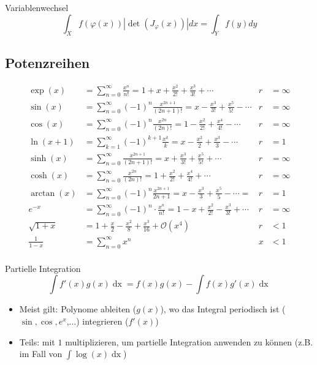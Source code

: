 \documentclass[a4paper,10pt]{article}
\def\sumn{\sum_{n=0}^\infty}
\def\sumk{\sum_{k=1}^\infty}
\begin{document}
\begin{subbox}{Variablenwechsel}
	$$\int_X f(\varphi(x)) | \det(J_\varphi(x)) | dx = \int_Y f(y) dy$$
\end{subbox}

\subsection{Potenzreihen}
\begin{align*}
	\exp(x)         & = \sumn \frac{x^n}{n!} = 1 + x + \frac{x^2}{2!} + \frac{x^3}{3!} + \cdots                  & r & = \infty \\
	\sin(x)         & = \sumn (-1)^n \frac{x^{2n + 1}}{(2n + 1)!} = x - \frac{x^3}{3!} + \frac{x^5}{5!} - \cdots & r & = \infty \\
	\cos(x)         & = \sumn (-1)^n \frac{x^{2n}}{(2n)!} = 1 - \frac{x^2}{2!} + \frac{x^4}{4!} - \cdots         & r & = \infty \\
	\ln(x + 1)      & = \sumk (-1)^{k+1} \frac{x^k}{k} = x - \frac{x^2}{2} + \frac{x^3}{3} - \cdots              & r & = 1      \\
	\sinh(x)        & = \sumn \frac{x^{2n+1}}{(2n+1)!} = x + \frac{x^3}{3!} + \frac{x^5}{5!} + \cdots            & r & = \infty \\
	\cosh(x)        & = \sumn \frac{x^{2n}}{(2n)!} = 1 + \frac{x^2}{2!} + \frac{x^4}{4!} + \cdots                & r & = \infty \\
	\arctan(x)      & = \sumn (-1)^n \frac{x^{2n+1}}{2n+1} = x - \frac{x^3}{3} + \frac{x^5}{5} - \cdots =        & r & = 1      \\
	e^{-x}          & = \sumn (-1)^n \cdot \frac{x^n}{n!} = 1 - x + \frac{x^2}{2!} - \frac{x^3}{3!} + \cdots     & r & = \infty \\
	\sqrt{1+x}      & = 1 + \frac{x}{2} - \frac{x^2}{8} + \frac{x^3}{16} + \mathcal{O}(x^4)                      & r & < 1      \\
	\frac{1}{1 - x} & = \sumn x^n                                                                                & x & < 1      \\
\end{align*}

\begin{mainbox}{Partielle Integration}
	$$\int f'(x) g(x) \mathop{dx} = f(x)g(x) - \int f(x) g'(x) \mathop{dx}$$
\end{mainbox}

\begin{itemize}
	\item Meist gilt: Polynome ableiten ($g(x)$), wo das Integral periodisch ist ($\sin, \cos, e^x$,...) integrieren ($f'(x)$)
	\item Teils: mit $1$ multiplizieren, um partielle Integration anwenden zu können (z.B. im Fall von $\int \log(x) \mathop{dx}$)
\end{itemize}
\end{document}
